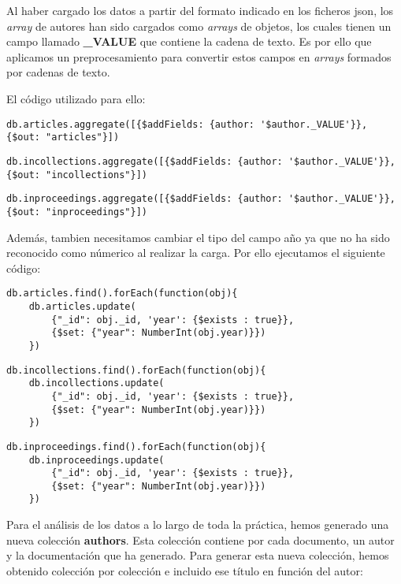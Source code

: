 Al haber cargado los datos a partir del formato indicado en los ficheros json, los \textit{array} de autores han sido cargados como \textit{arrays} de objetos, los cuales tienen un campo llamado \textbf{\_VALUE} que contiene la cadena de texto. Es por ello que aplicamos un preprocesamiento para convertir estos campos en \textit{arrays} formados por cadenas de texto.

El código utilizado para ello:

\begin{verbatim}
db.articles.aggregate([{$addFields: {author: '$author._VALUE'}}, {$out: "articles"}])
\end{verbatim}
\begin{verbatim}
db.incollections.aggregate([{$addFields: {author: '$author._VALUE'}}, {$out: "incollections"}])
\end{verbatim}
\begin{verbatim}
db.inproceedings.aggregate([{$addFields: {author: '$author._VALUE'}}, {$out: "inproceedings"}])
\end{verbatim}

Además, tambien necesitamos cambiar el tipo del campo año ya que no ha sido reconocido como númerico al realizar la carga. Por ello ejecutamos el siguiente código:
  
\begin{verbatim}
db.articles.find().forEach(function(obj){
    db.articles.update(
        {"_id": obj._id, 'year': {$exists : true}},
        {$set: {"year": NumberInt(obj.year)}})
    })
\end{verbatim}

\begin{verbatim}
db.incollections.find().forEach(function(obj){
    db.incollections.update(
        {"_id": obj._id, 'year': {$exists : true}},
        {$set: {"year": NumberInt(obj.year)}})
    })
\end{verbatim}

\begin{verbatim}
db.inproceedings.find().forEach(function(obj){
    db.inproceedings.update(
        {"_id": obj._id, 'year': {$exists : true}},
        {$set: {"year": NumberInt(obj.year)}})
    })
\end{verbatim}

Para el análisis de los datos a lo largo de toda la práctica, hemos generado una nueva colección \textbf{authors}. Esta colección contiene por cada documento, un autor y la documentación que ha generado. Para generar esta nueva colección, hemos obtenido colección por colección e incluido ese título en función del autor:

